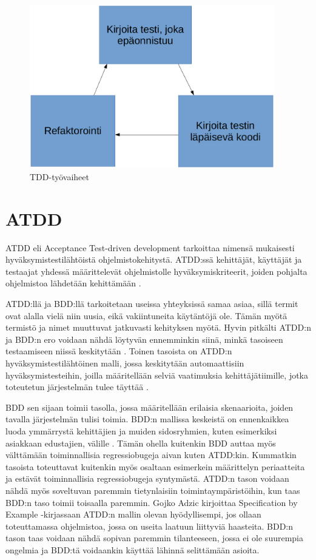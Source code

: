 \documentclass[finnish,nonumbib,nocopyright]{gradu2}
\begin{document}
\begin{figure}
\centering
\includegraphics[width=0.95\textwidth]{tdd.eps}
\caption{TDD-työvaiheet}
\end{figure}

\section{ATDD}
ATDD eli Acceptance Test-driven development tarkoittaa nimensä mukaisesti hyväksymistestilähtöistä ohjelmistokehitystä. ATDD:ssä kehittäjät, käyttäjät ja testaajat yhdessä määrittelevät ohjelmistolle hyväksymiskriteerit, joiden pohjalta ohjelmistoa lähdetään kehittämään \cite{difference}.  

ATDD:llä ja BDD:llä tarkoitetaan useissa yhteyksissä samaa asiaa, sillä termit ovat alalla vielä niin uusia, eikä vakiintuneita käytäntöjä ole. Tämän myötä termistö ja nimet muuttuvat jatkuvasti kehityksen myötä. Hyvin pitkälti ATDD:n ja BDD:n ero voidaan nähdä löytyvän ennemminkin siinä, minkä tasoiseen testaamiseen niissä keskitytään \cite{difference}. Toinen tasoista on ATDD:n hyväksymistestilähtöinen malli, jossa keskitytään automaattisiin hyväksymistesteihin, joilla määritellään selviä vaatimuksia kehittäjätiimille, jotka toteutetun järjestelmän tulee täyttää \cite{specification}.

BDD sen sijaan toimii tasolla, jossa määritellään erilaisia skenaarioita, joiden tavalla järjestelmän tulisi toimia. BDD:n mallissa keskeistä on ennenkaikkea luoda ymmärrystä kehittäjien ja muiden sidosryhmien, kuten esimerkiksi asiakkaan edustajien, välille \cite{specification}. Tämän ohella kuitenkin BDD auttaa myös välttämään toiminnallisia regressiobugeja aivan kuten ATDD:kin. Kummatkin tasoista toteuttavat kuitenkin myös osaltaan esimerkein määrittelyn periaatteita ja estävät toiminnallisia regressiobugeja syntymästä. ATDD:n tason voidaan nähdä myös soveltuvan paremmin tietynlaisiin toimintaympäristöihin, kun taas BDD:n taso toimii toisaalla paremmin. Gojko Adzic kirjoittaa Specification by Example -kirjassaan \cite{specification} ATDD:n mallin olevan hyödyllisempi, jos ollaan toteuttamassa ohjelmistoa, jossa on useita laatuun liittyviä haasteita. BDD:n tason taas voidaan nähdä sopivan paremmin tilanteeseen, jossa ei ole suurempia ongelmia ja BDD:tä voidaankin käyttää lähinnä selittämään asioita. 
\end{document}
